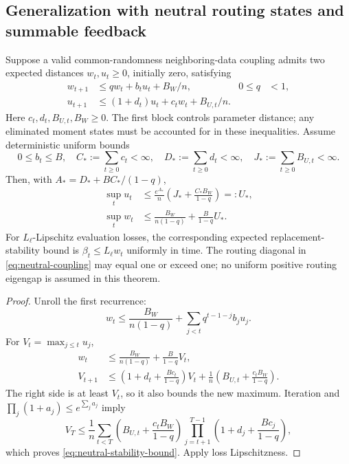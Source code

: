 \subsection{Generalization with neutral routing states and summable feedback}
\label{app:neutral-state-stability}

\begin{theorem}
\label{thm:neutral-routing-stability}
Suppose a valid common-randomness neighboring-data coupling admits two
expected distances $w_t,u_t\ge0$, initially zero, satisfying
\begin{align}
 w_{t+1}&\le q w_t+b_tu_t+B_W/n,&0\le q&<1,\\
 u_{t+1}&\le(1+d_t)u_t+c_tw_t+B_{U,t}/n.\label{eq:neutral-coupling}
\end{align}
Here $c_t,d_t,B_{U,t},B_W\ge0$.
The first block controls parameter distance; any eliminated moment states
must be accounted for in these inequalities. Assume deterministic uniform
bounds
\begin{equation}
 0\le b_t\le B,\quad
 C_*:=\sum_{t\ge0}c_t<\infty,\quad
 D_*:=\sum_{t\ge0}d_t<\infty,\quad
 J_*:=\sum_{t\ge0}B_{U,t}<\infty.
\end{equation}
Then, with $A_*=D_*+BC_* /(1-q)$,
\begin{align}
 \sup_tu_t&\le\frac{e^{A_*}}n
                  \left(J_*+\frac{C_*B_W}{1-q}\right)=:U_*,\\
 \sup_tw_t&\le\frac{B_W}{n(1-q)}+\frac{B}{1-q}U_*.
 \label{eq:neutral-stability-bound}
\end{align}
For $L_\ell$-Lipschitz evaluation losses, the corresponding expected
replacement-stability bound is $\beta_t\le L_\ell w_t$ uniformly in time.
The routing diagonal in \eqref{eq:neutral-coupling} may equal one or exceed
one; no uniform positive routing eigengap is assumed in this theorem.
\end{theorem}
\begin{proof}
Unroll the first recurrence:
\begin{equation}
 w_t\le\frac{B_W}{n(1-q)}+
                    \sum_{j<t}q^{t-1-j}b_ju_j.
\end{equation}
For $V_t=\max_{j\le t}u_j$,
\begin{align}
 w_t&\le\frac{B_W}{n(1-q)}+\frac{B}{1-q}V_t,\\
 V_{t+1}&\le\left(1+d_t+\frac{Bc_t}{1-q}\right)V_t
              +\frac1n\left(B_{U,t}+\frac{c_tB_W}{1-q}\right).
\end{align}
The right side is at least $V_t$, so it also bounds the new maximum.
Iteration and $\prod_j(1+a_j)\le e^{\sum_ja_j}$ imply
\begin{equation}
 V_T\le\frac1n\sum_{t<T}
 \left(B_{U,t}+\frac{c_tB_W}{1-q}\right)
 \prod_{j=t+1}^{T-1}\left(1+d_j+\frac{Bc_j}{1-q}\right),
\end{equation}
which proves \eqref{eq:neutral-stability-bound}. Apply loss Lipschitzness.
\end{proof}

